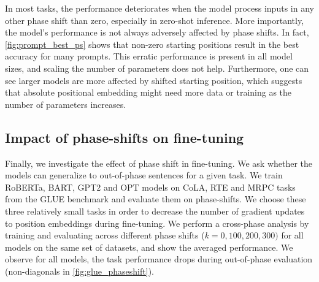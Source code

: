 \documentclass[letterpaper, 12pt]{report}
\begin{document}
In most tasks, the performance deteriorates when the model process inputs in any other phase shift than zero, especially in zero-shot inference.
More importantly, the model's performance is not always adversely affected by phase shifts. In fact, \autoref{fig:prompt_best_ps} shows that non-zero starting positions result in the best accuracy for many prompts.
This erratic performance is present in all model sizes, and scaling the number of parameters does not help.
Furthermore, one can see larger models are more affected by shifted starting position, which suggests that absolute positional embedding might need more data or training as the number of parameters increases.

\subsection{Impact of phase-shifts on fine-tuning}
\label{sec:pos_finetuning}

Finally, we investigate the effect of phase shift in fine-tuning.
We ask whether the models can generalize to out-of-phase sentences for a given task.
We train RoBERTa, BART, GPT2 and OPT models on CoLA, RTE and MRPC tasks from the GLUE benchmark \citep{Wang2018:GLUE} and evaluate them on phase-shifts.
We choose these three relatively small tasks in order to decrease the number of gradient updates to position embeddings during fine-tuning.
We perform a cross-phase analysis by training and evaluating across different phase shifts ($k={0,100,200,300})$ for all models on the same set of datasets, and show the averaged performance.
We observe for all models, the task performance drops during out-of-phase evaluation (non-diagonals in \autoref{fig:glue_phaseshift}).
\end{document}
